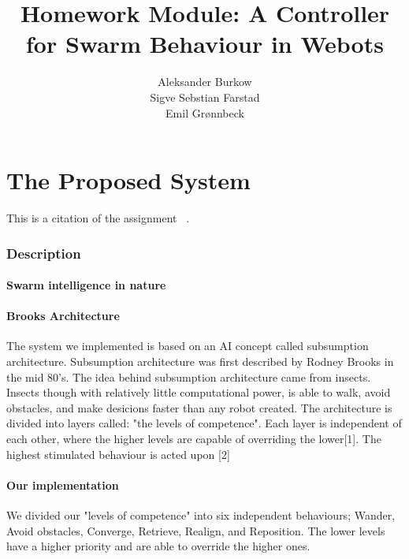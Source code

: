 \documentclass{article}
\title{Homework Module: A Controller for Swarm Behaviour in Webots}
\author{
    Aleksander Burkow \\
    Sigve Sebstian Farstad \\
    Emil Grønnbeck
}
\begin{document}
\maketitle
\thispagestyle{empty}


\newpage

\setcounter{page}{1}

\part{The Proposed System}

This is a citation of the assignment ~\cite{assignment}.

\section{Description}


\subsection{Swarm intelligence in nature}



\subsection{Brooks Architecture}
The system we implemented is based on an AI concept called subsumption architecture. Subsumption architecture was first described by Rodney Brooks in the mid 80's. The idea behind subsumption architecture came from insects. Insects though with relatively little computational power, is able to walk, avoid obstacles, and make desicions faster than any robot created. The architecture is divided into layers called: "the levels of competence". Each layer is  independent of each other, where the higher levels are capable of overriding the lower[1]. The highest stimulated behaviour is acted upon [2]

\subsection{Our implementation}
We divided our "levels of competence" into six independent behaviours; Wander, Avoid obstacles, Converge, Retrieve, Realign, and Reposition. The lower levels have a higher priority and are able to override the higher ones.

\end{document}
